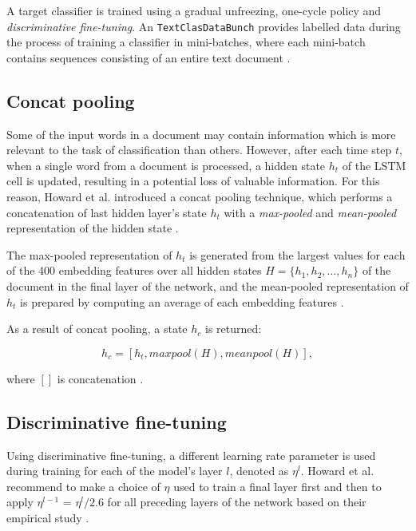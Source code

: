 A target classifier is trained using a gradual unfreezing, one-cycle policy and \emph{discriminative fine-tuning}. An \lstinline{TextClasDataBunch} provides labelled data during the process of training a classifier in mini-batches, where each mini-batch contains sequences consisting of an entire text document \cite{ulmfit:berlin}.

\subsection{Concat pooling}

Some of the input words in a document may contain information which is more relevant to the task of classification than others. However, after each time step $t$, when a single word from a document is processed, a hidden state $h_t$ of the LSTM cell is updated, resulting in a potential loss of valuable information. For this reason, Howard et al. introduced a concat pooling technique, which performs a concatenation of last hidden layer's state $h_t$ with a \emph{max-pooled} and \emph{mean-pooled} representation of the hidden state \cite{ulmfit}.

The max-pooled representation of $h_t$ is generated from the largest values for each of the 400 embedding features over all hidden states $H = \{h_1, h_2, \dots, h_n\}$ of the document in the final layer of the network, and the mean-pooled representation of $h_t$ is prepared by computing an average of each embedding features \cite{ulmfit:berlin}. 

As a result of concat pooling, a state $h_c$ is returned:

\begin{equation}
h_c = [h_t, maxpool(H), meanpool(H)],
\end{equation}

where $[]$ is concatenation \cite{ulmfit}.

\subsection{Discriminative fine-tuning}
\label{discriminativefinetuning}

Using discriminative fine-tuning, a different learning rate parameter is used during training for each of the model's layer $l$, denoted as $\eta^l$. Howard et al. recommend to make a choice of $\eta$ used to train a final layer first and then to apply $\eta^{l-1}$ = $\eta^l/2.6$ for all preceding layers of the network based on their empirical study \cite{ulmfit}. 

